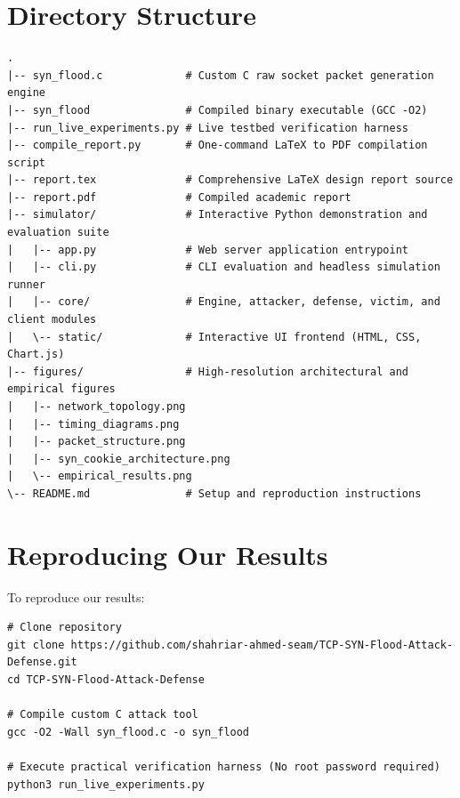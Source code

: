 \documentclass[11pt,a4paper]{report}
\begin{document}
\begin{center}
\end{center}

\section{Directory Structure}
\begin{lstlisting}[style=customc, caption={Repository layout}]
.
|-- syn_flood.c             # Custom C raw socket packet generation engine
|-- syn_flood               # Compiled binary executable (GCC -O2)
|-- run_live_experiments.py # Live testbed verification harness
|-- compile_report.py       # One-command LaTeX to PDF compilation script
|-- report.tex              # Comprehensive LaTeX design report source
|-- report.pdf              # Compiled academic report
|-- simulator/              # Interactive Python demonstration and evaluation suite
|   |-- app.py              # Web server application entrypoint
|   |-- cli.py              # CLI evaluation and headless simulation runner
|   |-- core/               # Engine, attacker, defense, victim, and client modules
|   \-- static/             # Interactive UI frontend (HTML, CSS, Chart.js)
|-- figures/                # High-resolution architectural and empirical figures
|   |-- network_topology.png
|   |-- timing_diagrams.png
|   |-- packet_structure.png
|   |-- syn_cookie_architecture.png
|   \-- empirical_results.png
\-- README.md               # Setup and reproduction instructions
\end{lstlisting}

\section{Reproducing Our Results}
To reproduce our results:
\begin{lstlisting}[style=terminal]
# Clone repository
git clone https://github.com/shahriar-ahmed-seam/TCP-SYN-Flood-Attack-Defense.git
cd TCP-SYN-Flood-Attack-Defense

# Compile custom C attack tool
gcc -O2 -Wall syn_flood.c -o syn_flood

# Execute practical verification harness (No root password required)
python3 run_live_experiments.py
\end{lstlisting}
\end{document}
